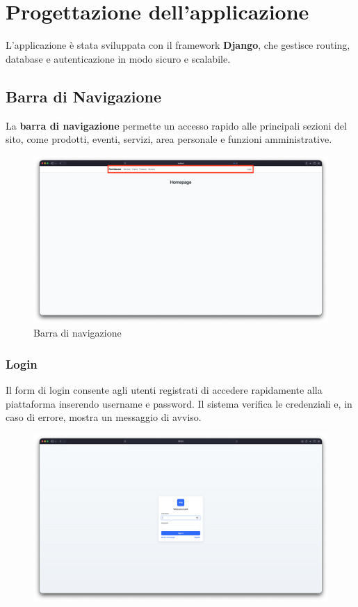\documentclass[a4paper,12pt]{report}
\begin{document}
\chapter{Progettazione dell'applicazione}
L'applicazione è stata sviluppata con il framework \textbf{Django}, che gestisce routing, 
database e autenticazione in modo sicuro e scalabile.

\section{Barra di Navigazione}
La \textbf{barra di navigazione} permette un accesso rapido alle principali sezioni del sito, 
come prodotti, eventi, servizi, area personale e funzioni amministrative.

\begin{figure}[H]
    \centering
    \includegraphics[width=\textwidth, trim=0 0 0 0]{./img/navbar.png}
    \caption{Barra di navigazione}
    \label{fig:navbar}
\end{figure}

\newpage
\subsection*{Login}

Il form di login consente agli utenti registrati di accedere rapidamente alla piattaforma inserendo username e 
password. Il sistema verifica le credenziali e, in caso di errore, mostra un messaggio di avviso.

\begin{figure}[H]
    \centering
    \includegraphics[width=\textwidth, trim=0 0 0 0]{./img/login.png}
    \vspace{-1em}
    \label{fig:login}
\end{figure}
\end{document}
